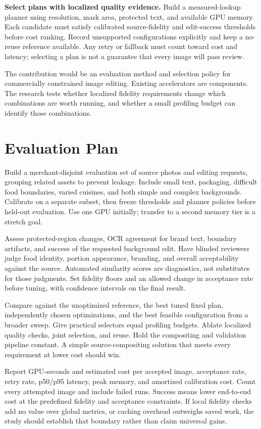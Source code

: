 \documentclass{article}
\begin{document}
\textbf{Select plans with localized quality evidence.} Build a measured-lookup planner using resolution, mask area, protected text, and available GPU memory. Each candidate must satisfy calibrated source-fidelity and edit-success thresholds before cost ranking. Record unsupported configurations explicitly and keep a no-reuse reference available. Any retry or fallback must count toward cost and latency; selecting a plan is not a guarantee that every image will pass review.

The contribution would be an evaluation method and selection policy for commercially constrained image editing. Existing accelerators are components. The research tests whether localized fidelity requirements change which combinations are worth running, and whether a small profiling budget can identify those combinations.

\section{Evaluation Plan}
Build a merchant-disjoint evaluation set of source photos and editing requests, grouping related assets to prevent leakage. Include small text, packaging, difficult food boundaries, varied cuisines, and both simple and complex backgrounds. Calibrate on a separate subset, then freeze thresholds and planner policies before held-out evaluation. Use one GPU initially; transfer to a second memory tier is a stretch goal.

Assess protected-region changes, OCR agreement for brand text, boundary artifacts, and success of the requested background edit. Have blinded reviewers judge food identity, portion appearance, branding, and overall acceptability against the source. Automated similarity scores are diagnostics, not substitutes for those judgments. Set fidelity floors and an allowed change in acceptance rate before tuning, with confidence intervals on the final result.

Compare against the unoptimized reference, the best tuned fixed plan, independently chosen optimizations, and the best feasible configuration from a broader sweep. Give practical selectors equal profiling budgets. Ablate localized quality checks, joint selection, and reuse. Hold the compositing and validation pipeline constant. A simple source-compositing solution that meets every requirement at lower cost should win.

Report GPU-seconds and estimated cost per accepted image, acceptance rate, retry rate, p50/p95 latency, peak memory, and amortized calibration cost. Count every attempted image and include failed runs. Success means lower end-to-end cost at the predefined fidelity and acceptance constraints. If local fidelity checks add no value over global metrics, or caching overhead outweighs saved work, the study should establish that boundary rather than claim universal gains.
\end{document}
